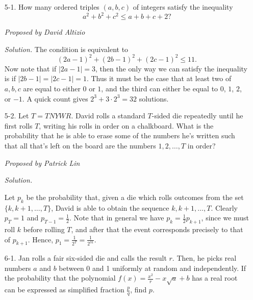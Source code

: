 \documentclass[10pt]{article}
\newcommand{\proposed}[1]
{
\vspace{5pt}
\noindent\textit{Proposed by #1}
}
\newcommand{\solution}
{
\vspace{5pt}
\noindent\textit{Solution.}\qquad
}
\begin{document}
\begin{enumerate}
\proposed{David Altizio}

\solution Let $WE=AN=\ell$.  Now pick $U'\in MU$ such that $NU'\parallel CU$.  Then $\triangle NMU'\sim\triangle CMU$, and in particular \[MU' = MW + WU' = MW + EU = 14-\ell.\] Thus $NW = \frac{12}{14}(14-\ell) = 12 - \frac67\ell$, and so \[T = NW\cdot WE = \ell\left(12 - \frac67\ell\right).\] Plugging in $T=32$ and solving the quadratic for $\ell$ yields $\ell = 7\pm\sqrt{\frac{35}3}$, and so the maximum possible value for the perimeter of $WEAN$ is \[2\left[\ell + \left(12 - \frac67\ell\right)\right] = 24 + \frac27\ell = \boxed{26 + \frac{\sqrt{440}}{21}}.\]


\item[5-1.] How many ordered triples $(a,b,c)$ of integers satisfy the inequality \[a^2+b^2+c^2 \leq a+b+c+2?\]

\proposed{David Altizio}

\solution The condition is equivalent to \[(2a-1)^2 + (2b-1)^2 + (2c-1)^2 \leq 11.\] Now note that if $|2a-1| = 3$, then the only way we can satisfy the inequality is if $|2b-1| = |2c-1| = 1$.  Thus it must be the case that at least two of $a,b,c$ are equal to either $0$ or $1$, and the third can either be equal to $0$, $1$, $2$, or $-1$.  A quick count gives $2^3 + 3\cdot 2^3 = \boxed{32}$ solutions.

\item[5-2.] Let $T = TNYWR$. David rolls a standard $T$-sided die repeatedly until he first rolls $T$, writing his rolls in order on a chalkboard. What is the probability that he is able to erase some of the numbers he's written such that all that's left on the board are the numbers $1, 2, \dots, T$ in order?

\proposed{Patrick Lin}

\solution
Let $p_k$ be the probability that, given a die which rolls outcomes from the set $\{k, k+1, \dots, T\}$, David is able to obtain the sequence $k, k+1, \dots, T$. Clearly $p_T = 1$ and $p_{T-1} = \frac12$. Note that in general we have $p_k = \frac12 p_{k+1}$, since we must roll $k$ before rolling $T$, and after that the event corresponds precisely to that of $p_{k+1}$. Hence, $p_1 = \frac{1}{2^T} = \boxed{\tfrac{1}{2^{31}}}$.


\item[6-1.] Jan rolls a fair six-sided die and calls the result $r$. Then, he picks real numbers $a$ and $b$ between 0 and 1 uniformly at random and independently. If the probability that the polynomial $f(x) = \tfrac{x^2}{r} - x\sqrt{a} + b$ has a real root can be expressed as simplified fraction $\frac{p}{q}$, find $p$.


\end{enumerate}
\end{document}
